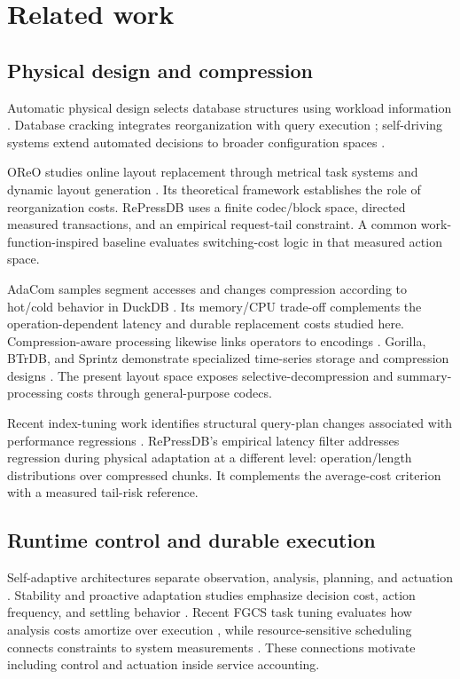 \section{Related work}
\label{sec:related}
\subsection{Physical design and compression}
Automatic physical design selects database structures using workload information \citep{chaudhuri1997autoadmin,bruno2005physical}. Database cracking integrates reorganization with query execution \citep{idreos2007cracking}; self-driving systems extend automated decisions to broader configuration spaces \citep{vanaken2017ottertune,pavlo2017selfdriving}.

OReO studies online layout replacement through metrical task systems and dynamic layout generation \citep{rong2024oreo}. Its theoretical framework establishes the role of reorganization costs. RePressDB uses a finite codec/block space, directed measured transactions, and an empirical request-tail constraint. A common work-function-inspired baseline evaluates switching-cost logic in that measured action space.

AdaCom samples segment accesses and changes compression according to hot/cold behavior in DuckDB \citep{windheuser2024adacom}. Its memory/CPU trade-off complements the operation-dependent latency and durable replacement costs studied here. Compression-aware processing likewise links operators to encodings \citep{stonebraker2005cstore,abadi2006compression,damme2020morphstore}. Gorilla, BTrDB, and Sprintz demonstrate specialized time-series storage and compression designs \citep{pelkonen2015gorilla,andersen2016btrdb,blalock2018sprintz}. The present layout space exposes selective-decompression and summary-processing costs through general-purpose codecs.

Recent index-tuning work identifies structural query-plan changes associated with performance regressions \citep{wu2025qpr}. RePressDB's empirical latency filter addresses regression during physical adaptation at a different level: operation/length distributions over compressed chunks. It complements the average-cost criterion with a measured tail-risk reference.

\subsection{Runtime control and durable execution}
Self-adaptive architectures separate observation, analysis, planning, and actuation \citep{kephart2003vision,garlan2004rainbow,salehie2009landscape,delemos2013roadmap}. Stability and proactive adaptation studies emphasize decision cost, action frequency, and settling behavior \citep{salama2017stability,ayala2021prodspl,chen2024reliable}. Recent FGCS task tuning evaluates how analysis costs amortize over execution \citep{alvarez2027online}, while resource-sensitive scheduling connects constraints to system measurements \citep{wu2027sensascale}. These connections motivate including control and actuation inside service accounting.

